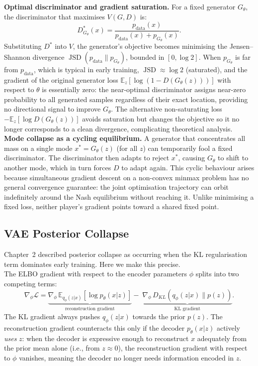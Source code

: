 \textbf{Optimal discriminator and gradient saturation.} For a fixed generator
$G_\theta$, the discriminator that maximises $V(G,D)$ is:
\[
    D^*_{G_\theta}(x)
    = \frac{p_{\text{data}}(x)}{p_{\text{data}}(x) + p_{G_\theta}(x)}.
\]
Substituting $D^*$ into $V$, the generator's objective becomes minimising the
Jensen--Shannon divergence $\operatorname{JSD}(p_{\text{data}} \| p_{G_\theta})$,
bounded in $[0, \log 2]$. When $p_{G_\theta}$ is far from $p_{\text{data}}$, which is typical in early training, $\operatorname{JSD} \approx \log 2$
(saturated), and the gradient of the original generator loss
$\mathbb{E}_z[\log(1 - D(G_\theta(z)))]$ with respect to $\theta$ is
essentially zero: the near-optimal discriminator assigns near-zero probability
to all generated samples regardless of their exact location, providing no
directional signal to improve $G_\theta$. The alternative non-saturating loss
$-\mathbb{E}_z[\log D(G_\theta(z))]$ avoids saturation but changes the
objective so it no longer corresponds to a clean divergence, complicating
theoretical analysis.\\

\textbf{Mode collapse as a cycling equilibrium.} A generator that concentrates
all mass on a single mode $x^* = G_\theta(z)$ (for all $z$) can temporarily
fool a fixed discriminator. The discriminator then adapts to reject $x^*$,
causing $G_\theta$ to shift to another mode, which in turn forces $D$ to adapt
again. This cyclic behaviour arises because simultaneous gradient descent on a
non-convex minmax problem has no general convergence guarantee: the joint
optimisation trajectory can orbit indefinitely around the Nash equilibrium
without reaching it. Unlike minimising a fixed loss, neither player's gradient
points toward a shared fixed point.

\subsection{VAE Posterior Collapse}

Chapter~2 described posterior collapse as occurring when the KL regularisation
term dominates early training. Here we make this precise.\\

The ELBO gradient with respect to the encoder parameters $\phi$ splits into
two competing terms:
\[
    \nabla_\phi \mathcal{L}
    = \underbrace{\nabla_\phi\,
      \mathbb{E}_{q_\phi(z|x)}[\log p_\theta(x|z)]}_{\text{reconstruction gradient}}
    -\;
    \underbrace{\nabla_\phi\,
      D_{KL}(q_\phi(z|x)\|p(z))}_{\text{KL gradient}}.
\]
The KL gradient always pushes $q_\phi(z|x)$ towards the prior $p(z)$.
The reconstruction gradient counteracts this only if the decoder
$p_\theta(x|z)$ actively \emph{uses} $z$: when the decoder is expressive
enough to reconstruct $x$ adequately from the prior mean alone
(i.e., from $z \approx 0$), the reconstruction gradient with respect to
$\phi$ vanishes, meaning the decoder no longer needs information encoded in $z$.\\

